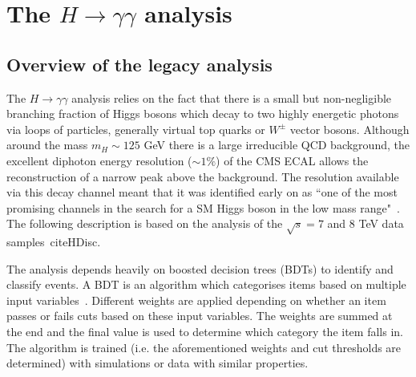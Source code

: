 \documentclass[10pt]{article}
\begin{document}
\newpage






\newpage

\section{The $H \rightarrow \gamma \gamma$ analysis}

\subsection{Overview of the legacy analysis}

The $H \rightarrow \gamma \gamma$ analysis relies on the fact that there is a small but non-negligible branching fraction of Higgs bosons which decay to two highly energetic photons via loops of particles, generally virtual top quarks or $W^{\pm}$ vector bosons. Although around the mass $m_H \sim 125$ GeV there is a large irreducible QCD background, the excellent diphoton energy resolution ($\sim 1 \%$) of the CMS ECAL allows the reconstruction of a narrow peak above the background. The resolution available via this decay channel meant that it was identified early on as “one of the most promising channels in the search for a SM Higgs boson in the low mass range"~\cite{Seez}. The following description is based on the analysis of the $\sqrt{s}=7$ and $8$ TeV data samples~cite{HDisc}.

The analysis depends heavily on boosted decision trees (BDTs) to identify and classify events. A BDT is an algorithm which categorises items based on multiple input variables~\cite{BDT}. Different weights are applied depending on whether an item passes or fails cuts based on these input variables. The weights are summed at the end and the final value is used to determine which category the item falls in. The algorithm is trained (i.e. the aforementioned weights and cut thresholds are determined) with simulations or data with similar properties. %
\end{document}
